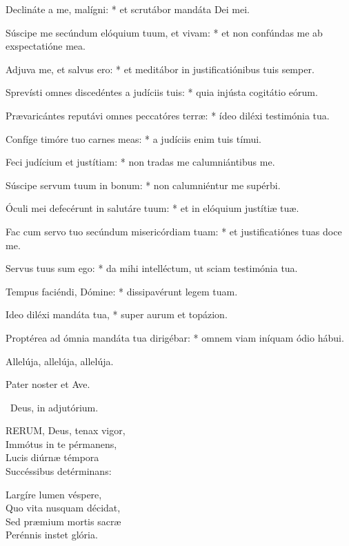 Declináte a me, malígni: * et scrutábor mandáta Dei mei.

Súscipe me secúndum elóquium tuum, et vivam: * et non confúndas me ab exspectatióne mea.

Adjuva me, et salvus ero: * et meditábor in justificatiónibus tuis semper.

Sprevísti omnes discedéntes a judíciis tuis: * quia injústa cogitátio eórum.

Prævaricántes reputávi omnes peccatóres terræ: * ídeo diléxi testimónia tua.

Confíge timóre tuo carnes meas: * a judíciis enim tuis tímui.

Feci judícium et justítiam: * non tradas me calumniántibus me.

Súscipe servum tuum in bonum: * non calumniéntur me supérbi.

Óculi mei defecérunt in salutáre tuum: * et in elóquium justítiæ tuæ.

Fac cum servo tuo secúndum misericórdiam tuam: * et justificatiónes tuas doce me.

Servus tuus sum ego: * da mihi intelléctum, ut sciam testimónia tua.

Tempus faciéndi, Dómine: * dissipavérunt legem tuam.

Ideo diléxi mandáta tua, * super aurum et topázion.

Proptérea ad ómnia mandáta tua dirigébar: * omnem viam iníquam ódio hábui.



 Allelúja, allelúja, allelúja.


\sectionornament


Pater noster et Ave.

\V\ Deus, in adjutórium.


\lettrine[lines=2]{R}{ERUM}, Deus, tenax vigor,\\
Immótus in te pérmanens,\\
Lucis diúrnæ témpora\\
Succéssibus detérminans:

Largíre lumen véspere,\\
Quo vita nusquam décidat,\\
Sed præmium mortis sacræ\\
Perénnis instet glória.

